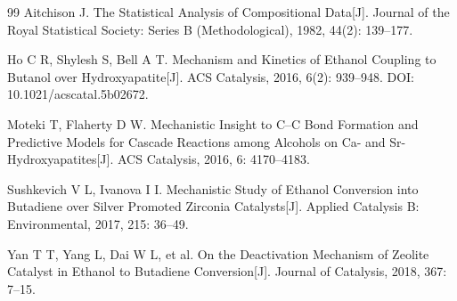 \begin{thebibliography}{99}
Aitchison J. The Statistical Analysis of Compositional Data[J]. Journal of the Royal
Statistical Society: Series B (Methodological), 1982, 44(2): 139--177.

Ho C R, Shylesh S, Bell A T. Mechanism and Kinetics of Ethanol Coupling to Butanol
over Hydroxyapatite[J]. ACS Catalysis, 2016, 6(2): 939--948.
DOI: 10.1021/acscatal.5b02672.

Moteki T, Flaherty D W. Mechanistic Insight to C--C Bond Formation and Predictive
Models for Cascade Reactions among Alcohols on Ca- and Sr-Hydroxyapatites[J].
ACS Catalysis, 2016, 6: 4170--4183.

Sushkevich V L, Ivanova I I. Mechanistic Study of Ethanol Conversion into Butadiene
over Silver Promoted Zirconia Catalysts[J]. Applied Catalysis B: Environmental, 2017,
215: 36--49.

Yan T T, Yang L, Dai W L, et al. On the Deactivation Mechanism of Zeolite Catalyst
in Ethanol to Butadiene Conversion[J]. Journal of Catalysis, 2018, 367: 7--15.
\end{thebibliography}
